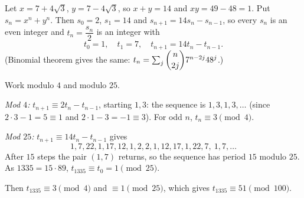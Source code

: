 Let $x=7+4\sqrt3$, $y=7-4\sqrt3$, so $x+y=14$ and $xy=49-48=1$. Put $s_n=x^n+y^n$. Then $s_0=2$, $s_1=14$ and $s_{n+1}=14s_n-s_{n-1}$, so every $s_n$ is an even integer and $t_n=\dfrac{s_n}{2}$ is an integer with
\[
t_0=1,\quad t_1=7,\quad t_{n+1}=14t_n-t_{n-1}.
\]
(Binomial theorem gives the same: $t_n=\sum_j\dbinom{n}{2j}7^{n-2j}48^j$.)

Work modulo $4$ and modulo $25$.

\emph{Mod $4$:} $t_{n+1}\equiv2t_n-t_{n-1}$, starting $1,3$: the sequence is $1,3,1,3,\dots$ (since $2\cdot3-1=5\equiv1$ and $2\cdot1-3=-1\equiv3$). For odd $n$, $t_n\equiv3\pmod4$.

\emph{Mod $25$:} $t_{n+1}\equiv14t_n-t_{n-1}$ gives
\[
1,7,22,1,17,12,1,2,2,1,12,17,1,22,7,\ 1,7,\dots
\]
After $15$ steps the pair $(1,7)$ returns, so the sequence has period $15$ modulo $25$. As $1335=15\cdot89$, $t_{1335}\equiv t_0=1\pmod{25}$.

Then $t_{1335}\equiv3\pmod4$ and $\equiv1\pmod{25}$, which gives $t_{1335}\equiv\boxed{51}\pmod{100}$.

